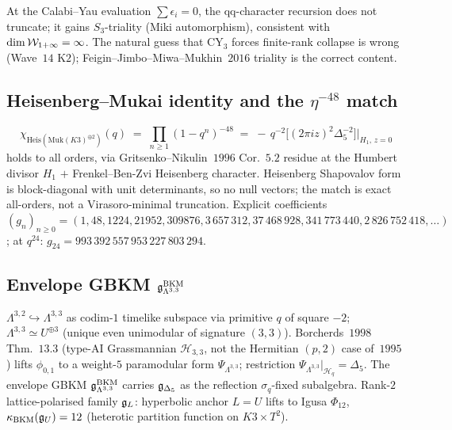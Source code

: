 \begin{remark}
\label{wn:rmk:plat-CY3-non-truncation}
At the Calabi--Yau evaluation $\sum \epsilon_i = 0$, the qq-character
recursion does not truncate; it gains $S_3$-triality (Miki automorphism),
consistent with $\dim \mathcal{W}_{1+\infty} = \infty$. The natural guess that CY$_3$
forces finite-rank collapse is wrong (Wave~$14$ K$2$);
Feigin--Jimbo--Miwa--Mukhin~$2016$ triality is the correct content.
\end{remark}

\subsection{Heisenberg--Mukai identity and the $\eta^{-48}$ match}
\label{wn:subsec:plat-heis-mukai}

\begin{theorem}\ClaimStatusTheorem
\label{wn:thm:plat-heis-mukai-eta48}
\[
\chi_{\mathrm{Heis}(\mathrm{Muk}(K3)^{\oplus 2})}(q) \;=\;
\prod_{n \geq 1}(1 - q^n)^{-48} \;=\;
-\, q^{-2} \bigl[(2\pi i z)^2 \Delta_5^{-2}\bigr]\Big|_{H_1,\, z = 0}
\]
holds to all orders, via Gritsenko--Nikulin~$1996$ Cor.~$5.2$ residue at
the Humbert divisor $H_1$ $+$ Frenkel--Ben-Zvi Heisenberg character.
Heisenberg Shapovalov form is block-diagonal with unit determinants, so
no null vectors; the match is exact all-orders, not a Virasoro-minimal
truncation.
Explicit coefficients $(g_n)_{n \geq 0}
= (1, 48, 1224, 21952, 309876, 3{\,}657{\,}312, 37{\,}468{\,}928,
341{\,}773{\,}440, 2{\,}826{\,}752{\,}418, \ldots)$; at $q^{24}$:
$g_{24} = 993{\,}392{\,}557{\,}953{\,}227{\,}803{\,}294$.
\end{theorem}

\subsection{Envelope GBKM $\mathfrak{g}^{\mathrm{BKM}}_{\Lambda^{3,3}}$}
\label{wn:subsec:plat-envelope}

\begin{theorem}\ClaimStatusTheorem
\label{wn:thm:plat-envelope}
$\Lambda^{3,2} \hookrightarrow \Lambda^{3,3}$ as codim-$1$ timelike
subspace via primitive $q$ of square $-2$; $\Lambda^{3,3} \simeq U^{\oplus 3}$
(unique even unimodular of signature $(3,3)$). Borcherds~$1998$ Thm.~$13.3$
(type-AI Grassmannian $\mathcal{H}_{3,3}$, not the Hermitian $(p,2)$ case
of~$1995$) lifts $\phi_{0,1}$ to a weight-$5$ paramodular form
$\Psi_{\Lambda^{3,3}}$; restriction
$\Psi_{\Lambda^{3,3}}|_{\mathcal{H}_q} = \Delta_5$. The envelope GBKM
$\mathfrak{g}^{\mathrm{BKM}}_{\Lambda^{3,3}}$ carries $\mathfrak{g}_{\Delta_5}$ as the
reflection $\sigma_q$-fixed subalgebra. Rank-$2$ lattice-polarised family
$\mathfrak{g}_L$: hyperbolic anchor $L = U$ lifts to Igusa $\Phi_{12}$, $\kappa_{\mathrm{BKM}}(\mathfrak{g}_U)
= 12$ (heterotic partition function on $K3 \times T^2$).
\end{theorem}


